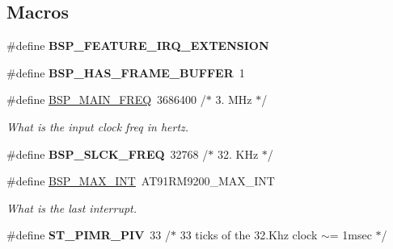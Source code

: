 \subsection*{Macros}
\begin{DoxyCompactItemize}
\item 
\mbox{\label{group__RTEMSBSPsARMGumstix_ga5d7d631d3a14b7554160f14eb42f351b}} 
\#define {\bfseries B\+S\+P\+\_\+\+F\+E\+A\+T\+U\+R\+E\+\_\+\+I\+R\+Q\+\_\+\+E\+X\+T\+E\+N\+S\+I\+ON}
\item 
\mbox{\label{group__RTEMSBSPsARMGumstix_ga18988f05911c2a1adcea89019029280b}} 
\#define {\bfseries B\+S\+P\+\_\+\+H\+A\+S\+\_\+\+F\+R\+A\+M\+E\+\_\+\+B\+U\+F\+F\+ER}~1
\item 
\mbox{\label{group__RTEMSBSPsARMGumstix_ga75e8d9125e928c238804d0cc9b520ebd}} 
\#define \mbox{\hyperlink{group__RTEMSBSPsARMGumstix_ga75e8d9125e928c238804d0cc9b520ebd}{B\+S\+P\+\_\+\+M\+A\+I\+N\+\_\+\+F\+R\+EQ}}~3686400      /$\ast$ 3. M\+Hz $\ast$/
\begin{DoxyCompactList}\small\item\em What is the input clock freq in hertz. \end{DoxyCompactList}\item 
\mbox{\label{group__RTEMSBSPsARMGumstix_gaad38bfd30fcb4bf2ebc8ec85444281a3}} 
\#define {\bfseries B\+S\+P\+\_\+\+S\+L\+C\+K\+\_\+\+F\+R\+EQ}~32768      /$\ast$ 32. K\+Hz $\ast$/
\item 
\mbox{\label{group__RTEMSBSPsARMGumstix_ga33750fa8211ef2e4abe8d852443af594}} 
\#define \mbox{\hyperlink{group__RTEMSBSPsARMGumstix_ga33750fa8211ef2e4abe8d852443af594}{B\+S\+P\+\_\+\+M\+A\+X\+\_\+\+I\+NT}}~A\+T91\+R\+M9200\+\_\+\+M\+A\+X\+\_\+\+I\+NT
\begin{DoxyCompactList}\small\item\em What is the last interrupt. \end{DoxyCompactList}\item 
\mbox{\label{group__RTEMSBSPsARMGumstix_ga027bc0f99eac8932ed52742be6dd443d}} 
\#define {\bfseries S\+T\+\_\+\+P\+I\+M\+R\+\_\+\+P\+IV}~33	/$\ast$ 33 ticks of the 32.\+Khz clock $\sim$= 1msec $\ast$/

\end{DoxyCompactItemize}
